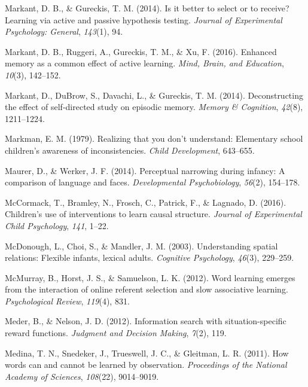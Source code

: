 \documentclass[oneside]{report}
\begin{document}
\leavevmode\hypertarget{ref-markant2014better}{}%
Markant, D. B., \& Gureckis, T. M. (2014). Is it better to select or to
receive? Learning via active and passive hypothesis testing.
\emph{Journal of Experimental Psychology: General}, \emph{143}(1), 94.

\leavevmode\hypertarget{ref-markant2016enhanced}{}%
Markant, D. B., Ruggeri, A., Gureckis, T. M., \& Xu, F. (2016). Enhanced
memory as a common effect of active learning. \emph{Mind, Brain, and
Education}, \emph{10}(3), 142--152.

\leavevmode\hypertarget{ref-markant2014deconstructing}{}%
Markant, D., DuBrow, S., Davachi, L., \& Gureckis, T. M. (2014).
Deconstructing the effect of self-directed study on episodic memory.
\emph{Memory \& Cognition}, \emph{42}(8), 1211--1224.

\leavevmode\hypertarget{ref-markman1979realizing}{}%
Markman, E. M. (1979). Realizing that you don't understand: Elementary
school children's awareness of inconsistencies. \emph{Child
Development}, 643--655.

\leavevmode\hypertarget{ref-maurer2014perceptual}{}%
Maurer, D., \& Werker, J. F. (2014). Perceptual narrowing during
infancy: A comparison of language and faces. \emph{Developmental
Psychobiology}, \emph{56}(2), 154--178.

\leavevmode\hypertarget{ref-mccormack2016children}{}%
McCormack, T., Bramley, N., Frosch, C., Patrick, F., \& Lagnado, D.
(2016). Children's use of interventions to learn causal structure.
\emph{Journal of Experimental Child Psychology}, \emph{141}, 1--22.

\leavevmode\hypertarget{ref-mcdonough2003understanding}{}%
McDonough, L., Choi, S., \& Mandler, J. M. (2003). Understanding spatial
relations: Flexible infants, lexical adults. \emph{Cognitive
Psychology}, \emph{46}(3), 229--259.

\leavevmode\hypertarget{ref-mcmurray2012word}{}%
McMurray, B., Horst, J. S., \& Samuelson, L. K. (2012). Word learning
emerges from the interaction of online referent selection and slow
associative learning. \emph{Psychological Review}, \emph{119}(4), 831.

\leavevmode\hypertarget{ref-meder2012information}{}%
Meder, B., \& Nelson, J. D. (2012). Information search with
situation-specific reward functions. \emph{Judgment and Decision
Making}, \emph{7}(2), 119.

\leavevmode\hypertarget{ref-medina2011words}{}%
Medina, T. N., Snedeker, J., Trueswell, J. C., \& Gleitman, L. R.
(2011). How words can and cannot be learned by observation.
\emph{Proceedings of the National Academy of Sciences}, \emph{108}(22),
9014--9019.
\end{document}
